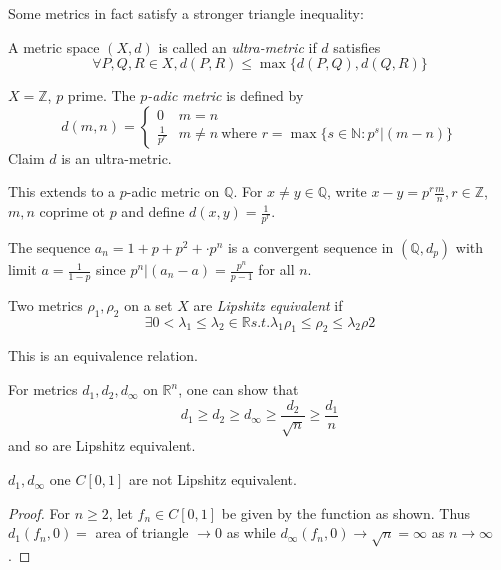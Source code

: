 \documentclass[a4paper]{article}
\begin{document}
Some metrics in fact satisfy a stronger triangle inequality:

\begin{defi}
  A metric space $(X,d)$ is called an \emph{ultra-metric} if $d$ satisfies
  \[
    \forall P,Q,R \in X, d(P,R) \leq \max\{d(P,Q), d(Q,R)\}
  \]
  
\end{defi}

\begin{ex}
  $X=\mathbb{Z}$, $p$ prime. The \emph{$p$-adic metric} is defined by
  \[
    d(m,n) =
    \begin{cases}
      0 & m = n \\
      \frac{1}{p^r} & m \neq n \: \text{where } r = \max\{s\in\mathbb{N}: p^s|(m-n)\}
    \end{cases}
  \]
  Claim $d$ is an ultra-metric.
\end{ex}

This extends to a $p$-adic metric on $\mathbb{Q}$. For $x\neq y \in \mathbb{Q}$, write $x-y = p^r \frac{m}{n}, r\in\mathbb{Z}$, $m, n$ coprime ot $p$ and define $d(x,y) = \frac{1}{p^r}$.

\begin{ex}
  The sequence $a_n = 1+p+p^2+\cdot p^n$ is a convergent sequence in $(\mathbb{Q},d_p)$ with limit $a = \frac{1}{1-p}$ since $p^n | (a_n-a) = \frac{p^n}{p-1}$ for all $n$.
\end{ex}

\begin{defi}
  Two metrics $\rho_1, \rho_2$ on a set $X$ are \emph{Lipshitz equivalent} if
  \[
    \exists 0 < \lambda_1 \leq \lambda_2 \in \mathbb{R} s.t. \lambda_1 \rho_1 \leq \rho_2 \leq \lambda_2\rho2
  \]
  
\end{defi}

This is an equivalence relation.

\begin{rmk}
  For metrics $d_1, d_2, d_\infty$ on $\mathbb{R}^n$, one can show that
  \[
    d_1 \geq d_2 \geq d_\infty \geq \frac{d_2}{\sqrt n} \geq \frac{d_1}{n}
  \]
  and so are Lipshitz equivalent.
\end{rmk}

\begin{prop}
  $d_1,d_\infty$ one $C[0,1]$ are not Lipshitz equivalent.
\end{prop}

\begin{proof}
  For $n \geq 2$, let $f_n \in C[0,1]$ be given by the function as shown. Thus $d_1(f_n,0) =$ area of triangle $\to 0$ as while $d_\infty(f_n,0) \to \sqrt n = \infty$ as $n \to \infty$.
\end{proof}
\end{document}
